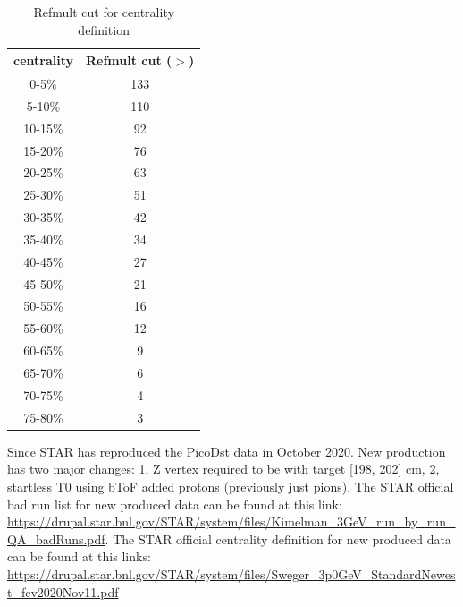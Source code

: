 \begin{table}[h]
    \centering
    \begin{tabular}{c|c}
    \hline
        centrality & Refmult cut ($>$) \\
        \hline
        0-5\% &  133 \\ 
        5-10\% & 110 \\
        10-15\% & 92 \\
        15-20\% & 76 \\
        20-25\% & 63 \\
        25-30\% & 51 \\
        30-35\% & 42 \\
        35-40\% & 34 \\ 
        40-45\% & 27 \\
        45-50\% & 21 \\
        50-55\% & 16 \\
        55-60\% & 12 \\
        60-65\% & 9 \\
        65-70\% & 6 \\
        70-75\% & 4 \\
        75-80\% & 3 \\
        \hline
    \end{tabular}
    \caption{Refmult cut for centrality definition}
    \label{tab:cent_def}
\end{table}

Since STAR has reproduced the PicoDst data in October 2020. New production has two major changes: 1, Z vertex required to be with target [198, 202] cm, 2, startless T0 using bToF added protons (previously just pions).
The STAR official bad run list for new produced data can be found at this link: \url{https://drupal.star.bnl.gov/STAR/system/files/Kimelman_3GeV_run_by_run_QA_badRuns.pdf}. The STAR official centrality definition for new produced data can be found at this links: \url{https://drupal.star.bnl.gov/STAR/system/files/Sweger_3p0GeV_StandardNewest_fcv2020Nov11.pdf}

